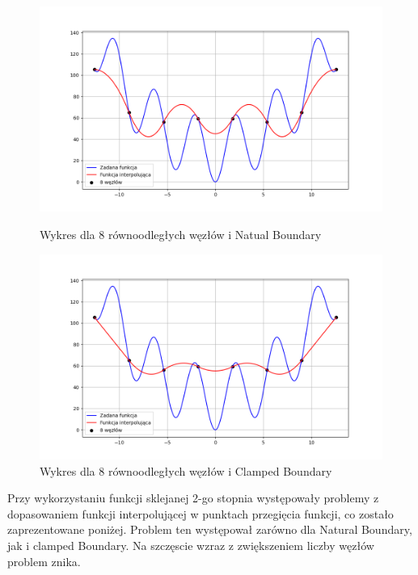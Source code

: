 \documentclass{article}
\begin{document}
\begin{figure}[H]
  \begin{minipage}[b]{0.49\textwidth}
    \includegraphics[width=\textwidth]{img19_n=8.png}
    \caption{Wykres dla 8 równoodległych węzłów i Natual Boundary}
  \end{minipage}
  \hfill
  \begin{minipage}[b]{0.49\textwidth}
    \includegraphics[width=\textwidth]{img20_n=8.png}
    \caption{Wykres dla 8 równoodległych węzłów i Clamped Boundary}
  \end{minipage}
\end{figure}

Przy wykorzystaniu funkcji sklejanej 2-go stopnia występowały problemy z dopasowaniem funkcji interpolującej w punktach przegięcia funkcji, co zostało zaprezentowane poniżej. Problem ten występował zarówno dla Natural Boundary, jak i clamped Boundary. Na szczęscie wzraz z zwiększeniem liczby węzłów problem znika.
\end{document}
